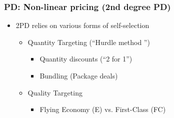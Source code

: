 \documentclass[10pt]{beamer}
\begin{document}
\begin{frame} 
	\frametitle{PD: Non-linear pricing (2nd degree PD)}
	
	




	\begin{itemize}
		
		\item 2PD relies on various forms of self-selection
		\smallskip
			\begin{itemize}
				\item Quantity Targeting (``Hurdle method '')
					\begin{itemize}
						\item Quantity discounts (``2 for 1'')
						\item Bundling (Package deals)%
					\end{itemize}
				\item Quality Targeting 
					\begin{itemize}
						\item Flying Economy (E) vs. First-Class (FC)
					\end{itemize}
				
			\end{itemize}	

	\end{itemize}
\bigskip


\end{frame}
\end{document}
